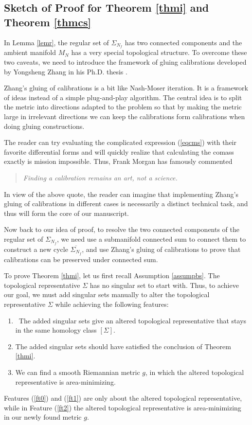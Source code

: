 \documentclass[11pt,a4paper]{amsart}
\numberwithin{equation}{section}
\newcommand{\Si}{\Sigma}
\newcommand{\ov}[1]{\overline{#1}}
\theoremstyle{plain}
\theoremstyle{definition}
\numberwithin{equation}{subsection}
\begin{document}
	\subsection{Sketch of Proof for Theorem \ref{thmi} and Theorem \ref{thmcs}}\label{secsk}In Lemma \ref{lemr}, the regular set of $\Si_{N_f}$ has two connected components and the ambient manifold $M_N$ has a very special topological structure. To overcome these two caveats, we need to introduce the framework of gluing calibrations developed by Yongsheng Zhang in his Ph.D. thesis \cite{YZa,YZj,YZt}.
	
	Zhang's gluing of calibrations is a bit like Nash-Moser iteration. It is a framework of ideas instead of a simple plug-and-play algorithm. The central idea is to split the metric into directions adapted to the problem so that by making the metric large in irrelevant directions \cite[Lemma 2.14]{HLf} we can keep the calibrations form calibrations when doing gluing constructions. 
	
	The reader can try evaluating the complicated expression (\ref{eqcms}) with their favorite differential forms and will quickly realize that calculating the comass exactly is mission impossible. Thus, Frank Morgan has famously commented \cite[p. 343]{FMct}
	\begin{quote}
		\emph{Finding a calibration remains an art, not a science.}
	\end{quote}
	In view of the above quote, the reader can imagine that implementing Zhang's gluing of calibrations in different cases is necessarily a distinct technical task, and thus will form the core of our manuscript.
	
	Now back to our idea of proof, to resolve the two connected components of the regular set of $\Si_{N_f}$, we need use a submanifold connected sum to connect them to construct a new cycle $\ov{\Si_{N_f}}$, and use Zhang's gluing of calibrations to prove that calibrations can be preserved under connected sum. 
	
	To prove Theorem \ref{thmi}, let us first recall Assumption \ref{assumpbs}. The topological representative $\Si$ has no singular set to start with. Thus, to achieve our goal, we must add singular sets manually to alter the topological representative $\Si$ while achieving the following features:
	\begin{enumerate}
		\item  The added singular sets give an altered topological representative that stays in the same homology class $[\Si]$.\label{ft0}
		\item The added singular sets should have satisfied the conclusion of Theorem \ref{thmi}.\label{ft1}
		\item We can find a smooth Riemannian metric $g$, in which the altered topological representative is area-minimizing.\label{ft2}	
	\end{enumerate}
	Features (\ref{ft0}) and (\ref{ft1}) are only about the altered topological representative, while in Feature (\ref{ft2}) the altered topological representative is area-minimizing in our newly found metric $g.$
	
\end{document}

